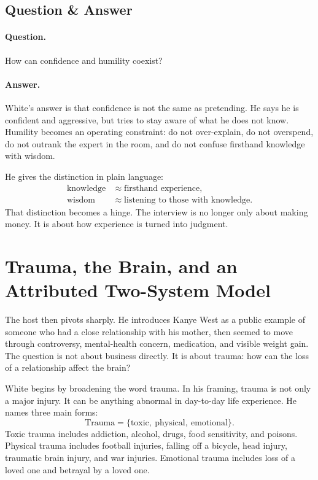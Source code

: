 \subsection{Question \& Answer}

\paragraph{Question.} How can confidence and humility coexist?

\paragraph{Answer.} White's answer is that confidence is not the same as pretending. He says he is confident and aggressive, but tries to stay aware of what he does not know. Humility becomes an operating constraint: do not over-explain, do not overspend, do not outrank the expert in the room, and do not confuse firsthand knowledge with wisdom.

He gives the distinction in plain language:
\begin{align}
\text{knowledge} &\approx \text{firsthand experience},\\
\text{wisdom} &\approx \text{listening to those with knowledge}.
\end{align}
That distinction becomes a hinge. The interview is no longer only about making money. It is about how experience is turned into judgment.

\section{Trauma, the Brain, and an Attributed Two-System Model}

The host then pivots sharply. He introduces Kanye West as a public example of someone who had a close relationship with his mother, then seemed to move through controversy, mental-health concern, medication, and visible weight gain. The question is not about business directly. It is about trauma: how can the loss of a relationship affect the brain?

White begins by broadening the word trauma. In his framing, trauma is not only a major injury. It can be anything abnormal in day-to-day life experience. He names three main forms:
\begin{equation}
\text{Trauma}
=
\{\text{toxic},\ \text{physical},\ \text{emotional}\}.
\end{equation}
Toxic trauma includes addiction, alcohol, drugs, food sensitivity, and poisons. Physical trauma includes football injuries, falling off a bicycle, head injury, traumatic brain injury, and war injuries. Emotional trauma includes loss of a loved one and betrayal by a loved one.

